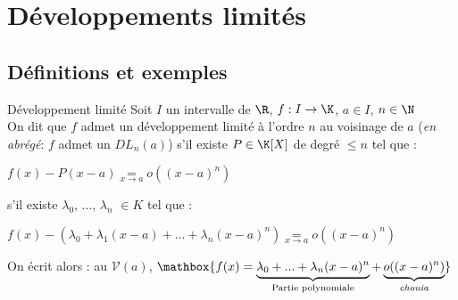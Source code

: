 \documentclass[12pt,a4paper]{report}
\begin{document}
\chapter{Développements limités}

\section{Définitions et exemples}
\begin{definition}{Développement limité}{}
Soit $I$ un intervalle de $\R$, $f:I\to \K$, $a\in I$, $n \in \N$\\
On dit que $f$ admet un développement limité à l'ordre $n$ au voisinage de $a$ (\textit{en abrégé}: $f$ admet un $DL_n(a)$) s'il existe $P\in \K[X]$ de degré $\leq n$ tel que : 
\begin{center}
    $f(x)-P(x-a) \underset{x \to a}{=} o((x-a)^n)$ 
\end{center}
\ie s'il existe $\lambda_0$, ..., $\lambda_n$ $\in K$ tel que :

\begin{center}
    $f(x)-(\lambda_0+\lambda_1(x-a)+...+\lambda_n(x-a)^n)\underset{x \to a}{=}o((x-a)^n)$    
\end{center}
On écrit alors : au $\mathcal{V}(a)$, $\mathbox{f(x)=\underbrace{\lambda_0+...+\lambda_n(x-a)^n}_{\text{Partie polynomiale}} + \underbrace{o((x-a)^n)}_{\text{\textit{chouia}}}}$
\end{definition}
\end{document}
